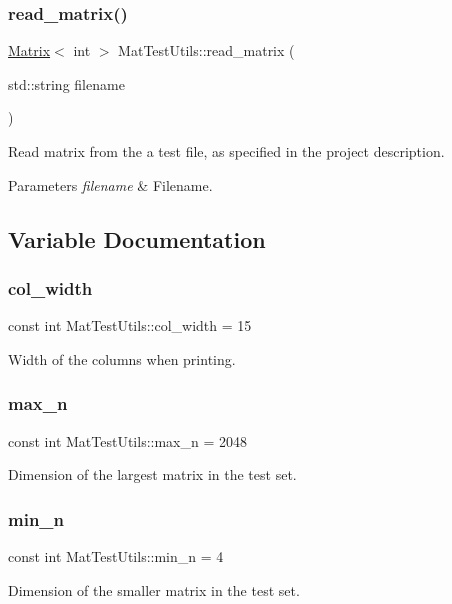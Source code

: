 \subsubsection{\texorpdfstring{read\+\_\+matrix()}{read\_matrix()}}
{\footnotesize\ttfamily \mbox{\hyperlink{classMatrix}{Matrix}}$<$ int $>$ Mat\+Test\+Utils\+::read\+\_\+matrix (\begin{DoxyParamCaption}\item[{std\+::string}]{filename }\end{DoxyParamCaption})}



Read matrix from the a test file, as specified in the project description. 


\begin{DoxyParams}{Parameters}
{\em filename} & Filename. \\
\hline
\end{DoxyParams}


\subsection{Variable Documentation}
\mbox{\label{namespaceMatTestUtils_a8d91bda429e88080233eaa273c885863}} 
\subsubsection{\texorpdfstring{col\+\_\+width}{col\_width}}
{\footnotesize\ttfamily const int Mat\+Test\+Utils\+::col\+\_\+width = 15}

Width of the columns when printing. \mbox{\label{namespaceMatTestUtils_aae57ce6440d799106e6f95f6094b2d6d}} 
\subsubsection{\texorpdfstring{max\+\_\+n}{max\_n}}
{\footnotesize\ttfamily const int Mat\+Test\+Utils\+::max\+\_\+n = 2048}

Dimension of the largest matrix in the test set. \mbox{\label{namespaceMatTestUtils_ac809b72319e3d38f960650baf31dc1e6}} 
\subsubsection{\texorpdfstring{min\+\_\+n}{min\_n}}
{\footnotesize\ttfamily const int Mat\+Test\+Utils\+::min\+\_\+n = 4}

Dimension of the smaller matrix in the test set. 